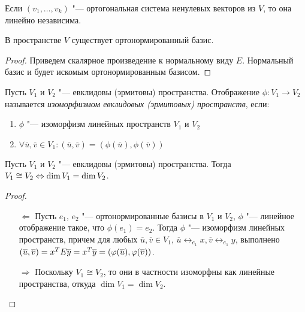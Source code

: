 \begin{corollary}
	Если $(v_1, \dots, v_k)$ "--- ортогональная система ненулевых векторов из $V$, то она линейно независима.
\end{corollary}

\begin{proposition}
	В пространстве $V$ существует ортонормированный базис.
\end{proposition}

\begin{proof}
	Приведем скалярное произведение к нормальному виду $E$. Нормальный базис и будет искомым ортонормированным базисом.
\end{proof}

\begin{definition}
	Пусть $V_1$ и $V_2$ "--- евклидовы (эрмитовы) пространства. Отображение $\phi: V_1 \rightarrow V_2$ называется \textit{изоморфизмом евклидовых (эрмитовых) пространств}, если:
	\begin{enumerate}
		\item $\phi$ "--- изоморфизм линейных пространств $V_1$ и $V_2$
		\item $\forall \overline{u}, \overline{v} \in V_1: (\overline{u}, \overline{v}) = (\phi(\overline{u}), \phi(\overline{v}))$
	\end{enumerate}
\end{definition}

\begin{theorem}
	Пусть $V_1$ и $V_2$ "--- евклидовы (эрмитовы) пространства. Тогда $V_1 \cong V_2 \hm\lra \dim{V_1} = \dim{V_2}$.
\end{theorem}

\begin{proof}~
	\begin{itemize}
		\item[$\Leftarrow$]Пусть $e_1$, $e_2$ "--- ортонормированные базисы в $V_1$ и $V_2$, $\phi$ "--- линейное отображение такое, что $\phi(e_1) = e_2$. Тогда $\phi$ "--- изоморфизм линейных пространств, причем для любых $\overline{u}, \overline{v} \in V_1$, $\overline{u} \leftrightarrow_{e_1} x, \overline{v} \leftrightarrow_{e_1} y$, выполнено $(\overline{u}, \overline{v}) = x^TE\overline{y} \hm{=} x^T\overline{y} = (\phi(\overline{u}), \phi(\overline{v}))$.
		\item[$\Rightarrow$]Поскольку $V_1 \cong V_2$, то они в частности изоморфны как линейные пространства, откуда $\dim{V_1} = \dim{V_2}$.\qedhere
	\end{itemize}
\end{proof}

